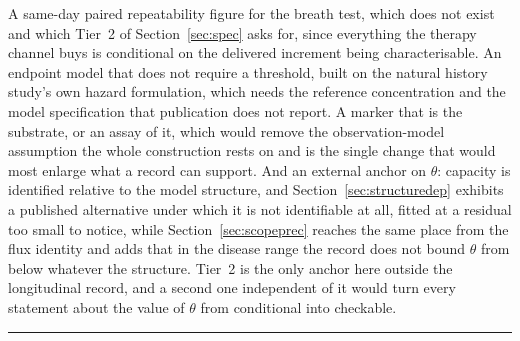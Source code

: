 A same-day paired repeatability figure for the breath test, which does not exist and which
Tier~2 of Section~\ref{sec:spec} asks for, since everything the therapy channel buys is
conditional on the delivered increment being characterisable. An endpoint model that does
not require a threshold, built on the natural history study's own hazard formulation, which
needs the reference concentration and the model specification that publication does not
report. A marker that is the substrate, or an assay of it, which would remove the
observation-model assumption the whole construction rests on and is the single change that
would most enlarge what a record can support. And an external anchor on $\theta$: capacity
is identified relative to the model structure, and Section~\ref{sec:structuredep} exhibits
a published alternative under which it is not identifiable at all, fitted at a residual too
small to notice, while Section~\ref{sec:scopeprec} reaches the same place from the flux
identity and adds that in
the disease range the record does not bound $\theta$ from below whatever the structure.
Tier~2 is the only anchor here outside the longitudinal record, and a second one
independent of it would turn every statement about the value of $\theta$ from conditional
into checkable.

\vspace{0.5em}
\hrule
\vspace{1em}

